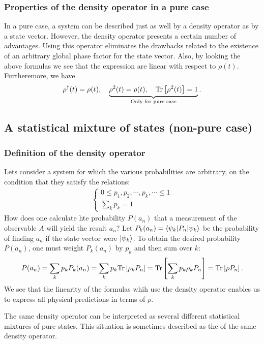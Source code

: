 \subsubsection{Properties of the density operator in a pure case}
In a pure case, a system can be described just as well by a density operator as by a state vector. However, the density operator presents a certain 
number of advantages. Using this operator eliminates the drawbacks related to the existence of an arbitrary global phase factor for the state vector.
Also, by looking the above formulas we see that the expression are linear with respect to $\rho(t)$.
Furtheremore, we have 
\begin{align}
    \rho^\dagger(t)=\rho(t),\quad \underbrace{\rho^2(t)=\rho(t),\quad\text{Tr}\left[\rho^2(t)\right]=1}_{\text{Only for pure case}}.
\end{align}

\subsection{A statistical mixture of states (non-pure case)}
\subsubsection{Definition of the density operator}
Lets consider a system for which the various probabilities are arbitrary, on the condition that they satisfy the relations:
\begin{align*}
\left\{\begin{array}{l}
    0\leq p_1,p_2,\cdots,p_k,\cdots\leq1\\
    \sum_kp_k=1
\end{array}\right.
\end{align*}
How does one calculate hte probability $P(a_n)$ that a measurement of the observable $A$ will yield the result $a_n$?
Let $P_k(a_n)=\langle\psi_k|P_n|\psi_k\rangle$ be the probability of finding $a_n$ if the state vector were $|\psi_k\rangle$. 
To obtain the desired probability $P(a_n)$, one must weight $P_k(a_n)$ by $p_k$ and then sum over $k$:
\begin{align}
    P(a_n)=\sum_kp_kP_k(a_n)=\sum_kp_k\text{Tr}\left[\rho_kP_n\right]=\text{Tr}\left[\sum_kp_k\rho_kP_n\right]=\text{Tr}\left[\rho P_n\right].
\end{align}
We see that the linearity of the formulas whih use the density operator enables us to express all physical predictions in terms of $\rho$.

The same density operator can be interpreted as several different statistical mixtures of pure states. This situation is sometimes described as the  of the 
same density operator.
